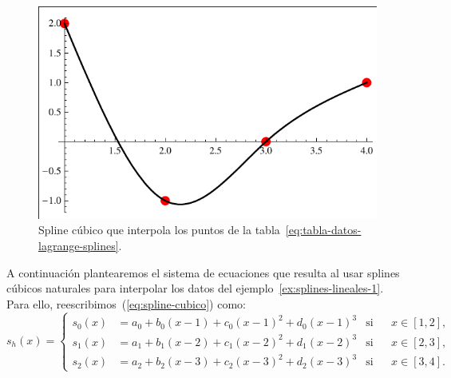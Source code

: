    \begin{example}
     \label{ex:splines-cubicos}
     \begin{figure}
       \centering
       \includegraphics[width=0.4\linewidth]{tema2/spline-cubico}
       \caption{Spline cúbico que interpola los puntos de la
         tabla~\ref{eq:tabla-datos-lagrange-splines}.}
       \label{fig:spline-cubico}
     \end{figure}
     A continuación plantearemos el sistema de ecuaciones que resulta al
     usar splines cúbicos naturales para
     interpolar los datos del ejemplo~\ref{ex:splines-lineales-1}. Para
     ello, reescribimos~(\ref{eq:spline-cubico}) como:
     \begin{equation*}
       s_h(x)=\left\{
         \begin{aligned}
           s_0(x)&=a_0 + b_0(x-1) + c_0(x-1)^2 + d_0(x-1)^3
           & \text{si} && x\in[1,2],
           \\
           s_1(x)&=a_1 + b_1(x-2) + c_1(x-2)^2 + d_1(x-2)^3
           &\text{si}&& x\in[2,3],
           \\
           s_2(x)&=a_2 + b_2(x-3) + c_2(x-3)^2 + d_2(x-3)^3
           & \text{si}&& x\in[3,4].
         \end{aligned}\right.
     \end{equation*}
   \end{example}

